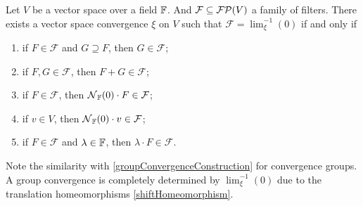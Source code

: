 \begin{proposition} \label{vectorSpaceConvergenceConstruction}
Let $V$ be a vector space over a field $\mathbb{F}$. And $\mathcal{F} \subseteq \operatorname{\mathcal{FP}}(V)$ a family of filters. There exists a vector space convergence $\xi$ on $V$ such that $\mathcal{F} = \lim^{-1}_\xi(0)$ \textup{if and only if}
\begin{enumerate}
\item if $F \in \mathcal{F}$ and $G\supseteq F$, then $G\in \mathcal{F}$;
\item if $F,G \in \mathcal{F}$, then $F + G\in \mathcal{F}$;
\item if $F\in \mathcal{F}$, then $\operatorname{\mathcal{N}}_{\mathbb{F}}(0)\cdot F \in \mathcal{F}$;
\item if $v\in V$, then $\operatorname{\mathcal{N}}_{\mathbb{F}}(0)\cdot v \in \mathcal{F}$;
\item if $F\in \mathcal{F}$ and $\lambda\in \mathbb{F}$, then $\lambda\cdot F \in \mathcal{F}$.
\end{enumerate}
\end{proposition}
Note the similarity with \ref{groupConvergenceConstruction} for convergence groups. A group convergence is completely determined by $\lim^{-1}_\xi(0)$ due to the translation homeomorphisms \ref{shiftHomeomorphism}.
